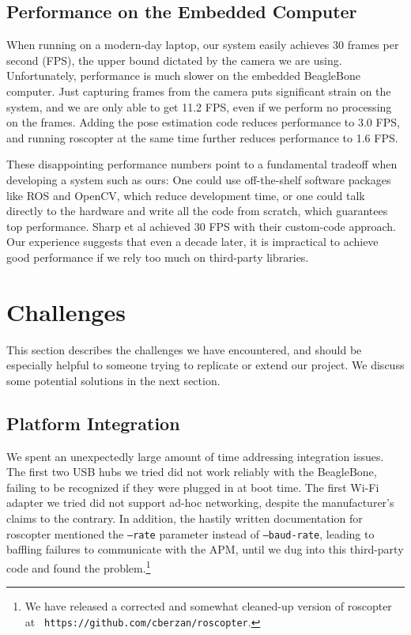 \documentclass[10pt]{scrartcl} %
\begin{document}
\subsection{Performance on the Embedded Computer}

When running on a modern-day laptop, our system easily achieves 30 frames per
second (FPS), the upper bound dictated by the camera we are using.
Unfortunately, performance is much slower on the embedded BeagleBone computer.
Just capturing frames from the camera puts significant strain on the system,
and we are only able to get 11.2 FPS, even if we perform no processing on the
frames. Adding the pose estimation code reduces performance to 3.0 FPS, and
running roscopter at the same time further reduces performance to 1.6 FPS.

These disappointing performance numbers point to a fundamental tradeoff when
developing a system such as ours: One could use off-the-shelf software packages
like ROS and OpenCV, which reduce development time, or one could talk directly
to the hardware and write all the code from scratch, which guarantees top
performance. Sharp et al \cite{sharp_et_al_2001} achieved 30 FPS with their
custom-code approach. Our experience suggests that even a decade later, it is
impractical to achieve good performance if we rely too much on third-party
libraries.


\section{Challenges}

This section describes the challenges we have encountered, and should be
especially helpful to someone trying to replicate or extend our project. We
discuss some potential solutions in the next section.

\subsection{Platform Integration}

We spent an unexpectedly large amount of time addressing integration issues.
The first two USB hubs we tried did not work reliably with the BeagleBone,
failing to be recognized if they were plugged in at boot time. The first Wi-Fi
adapter we tried did not support ad-hoc networking, despite the manufacturer's
claims to the contrary. In addition, the hastily written documentation for
roscopter mentioned the {\tt --rate} parameter instead of {\tt --baud-rate},
leading to baffling failures to communicate with the APM, until we dug into
this third-party code and found the problem.\footnote{We have released a
corrected and somewhat cleaned-up version of roscopter at {\tt
https://github.com/cberzan/roscopter}.}
\end{document}
